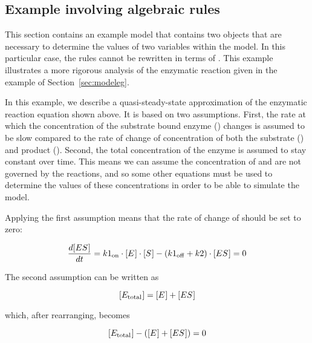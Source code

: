 \subsection{Example involving algebraic rules}
\label{sec:algeraiceg}

This section contains an example model that contains two
\AlgebraicRule objects that are necessary to determine the values
of two variables within the model.  In this particular case, the
rules cannot be rewritten in terms of \AssignmentRule.  This
example illustrates a more rigorous analysis of the enzymatic
reaction given in the example of Section~\ref{sec:modeleg}.
\begin{center}
\end{center}
In this example, we describe a quasi-steady-state approximation of
the enzymatic reaction equation shown above.  It is based on two
assumptions.  First, the rate at which the concentration of the
substrate bound enzyme () changes is assumed to be
slow compared to the rate of change of concentration of both the
substrate () and product ().  Second, the
total concentration of the enzyme is assumed to stay constant over
time.  This means we can assume the concentration of 
and  are not governed by the reactions, and so some
other equations must be used to determine the values of these
concentrations in order to be able to simulate the model.

Applying the first assumption means that the rate of change of
 should be set to zero:
\begin{linenomath}
\begin{equation*}
  \dfrac{d \concent{ES}}{d t} = k1\sub{on} \cdot \concent{E} \cdot \concent{S}
     - (k1\sub{off} + k2) \cdot \concent{ES} = 0
\end{equation*}
\end{linenomath}

The second assumption can be written as
\begin{linenomath}
\begin{equation*}
  \concent{E\sub{total}} = \concent{E} + \concent{ES}
\end{equation*}
\end{linenomath}
which, after rearranging, becomes
\begin{linenomath}
\begin{equation*}
  \concent{E\sub{total}} - (\concent{E} + \concent{ES}) = 0
\end{equation*}
\end{linenomath}

